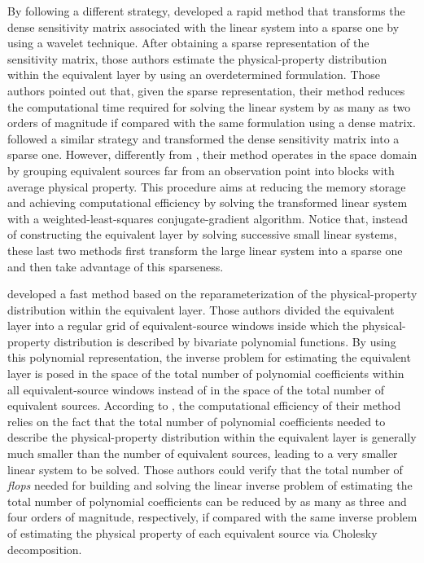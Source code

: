 By following a different strategy, \citet{li-oldenburg2010} developed a rapid method that transforms the 
dense sensitivity matrix associated with the linear system into a sparse one by using a wavelet technique. 
After obtaining a sparse representation of the sensitivity matrix, those authors estimate the 
physical-property distribution within the equivalent layer by using an overdetermined formulation. 
Those authors pointed out that, given the sparse representation, their method reduces the computational time 
required for solving the linear system by as many as two orders of magnitude if compared with the same 
formulation using a dense matrix. 
\citet{barnes-lumley2011} followed a similar strategy and transformed the dense sensitivity matrix 
into a sparse one. However, differently from \citet{li-oldenburg2010}, their method operates in the space 
domain by grouping equivalent sources far from an observation point into blocks with average physical 
property. This procedure aims at reducing the memory storage and achieving computational efficiency 
by solving the transformed linear system with a weighted-least-squares conjugate-gradient algorithm.
Notice that, instead of constructing the equivalent layer by solving successive small linear systems, 
these last two methods first transform the large linear system into a sparse one and then take advantage of 
this sparseness.

\citet{oliveirajr-etal2013} developed a fast method based on the reparameterization of the physical-property 
distribution within the equivalent layer. Those authors divided the equivalent layer into a regular grid of 
equivalent-source windows inside which the physical-property distribution is described by bivariate 
polynomial functions. By using this polynomial representation, the inverse problem for estimating the 
equivalent layer is posed in the space of the total number of polynomial coefficients within all 
equivalent-source windows instead of in the space of the total number of equivalent sources. According to 
\citet{oliveirajr-etal2013}, the computational efficiency of their method relies on the fact that the total 
number of polynomial coefficients needed to describe the physical-property distribution within the 
equivalent layer is generally much smaller than the number of equivalent sources, leading to a very smaller 
linear system to be solved. Those authors could verify that the total number of \textit{flops} needed for 
building and solving the linear inverse problem of estimating the total number of polynomial coefficients can 
be reduced by as many as three and four orders of magnitude, respectively, if compared with the same inverse 
problem of estimating the physical property of each equivalent source via Cholesky decomposition.

